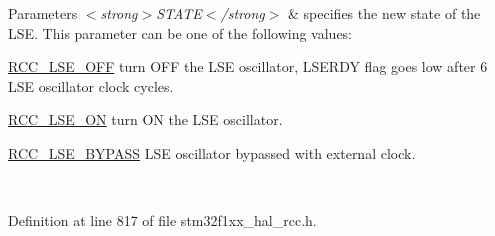 \begin{DoxyParams}{Parameters}
{\em $<$strong$>$\+S\+T\+A\+T\+E$<$/strong$>$} & specifies the new state of the L\+SE. This parameter can be one of the following values\+: \begin{DoxyItemize}
\item \hyperlink{group___r_c_c___l_s_e___config_ga6645c27708d0cad1a4ab61d2abb24c77}{R\+C\+C\+\_\+\+L\+S\+E\+\_\+\+O\+FF} turn O\+FF the L\+SE oscillator, L\+S\+E\+R\+DY flag goes low after 6 L\+SE oscillator clock cycles. \item \hyperlink{group___r_c_c___l_s_e___config_gac981ea636c2f215e4473901e0912f55a}{R\+C\+C\+\_\+\+L\+S\+E\+\_\+\+ON} turn ON the L\+SE oscillator. \item \hyperlink{group___r_c_c___l_s_e___config_gaad580157edbae878edbcc83c5a68e767}{R\+C\+C\+\_\+\+L\+S\+E\+\_\+\+B\+Y\+P\+A\+SS} L\+SE oscillator bypassed with external clock. \end{DoxyItemize}
\\
\hline
\end{DoxyParams}


Definition at line 817 of file stm32f1xx\+\_\+hal\+\_\+rcc.\+h.

